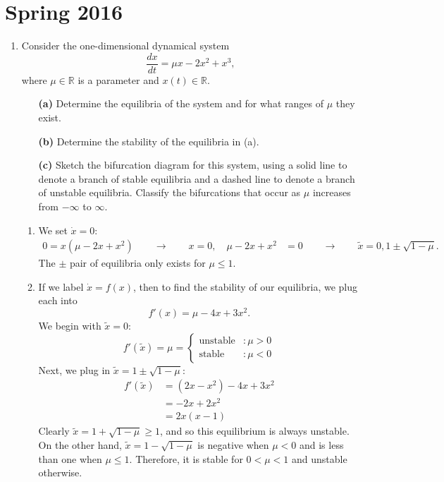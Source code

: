 \documentclass[10pt,letterpaper]{report}
\newcommand{\R}{\mathbb{R}}
\newcommand{\so}{\qquad \rightarrow \qquad}
\renewcommand{\chaptermark}[1]{%
\markboth{#1}{}}
\begin{document}
\chapter*{Spring 2016}
\chaptermark{Spring 2016}

\begin{enumerate}
\item \begin{qbox}
Consider the one-dimensional dynamical system
\[
\frac{dx}{dt} = \mu x - 2x^2 + x^3, 
\]
where $\mu \in \R$ is a parameter and $x(t) \in \R$.
\begin{itemize}
    \item[\textbf{(a)}] Determine the equilibria of the system and for what ranges of $\mu$ they exist.
    \item[\textbf{(b)}] Determine the stability of the equilibria in (a).
    \item[\textbf{(c)}] Sketch the bifurcation diagram for this system, using a solid line to denote a branch of stable equilibria and a dashed line to denote a branch of unstable equilibria. Classify the bifurcations that occur as $\mu$ increases from $-\infty$ to $\infty$.
\end{itemize}
\end{qbox}

\begin{enumerate}
    \item We set $\dot x = 0:$
    \begin{align*}
    0 = x\left(\mu - 2x + x^2\right) \so x = 0, \quad \mu -2x + x^2 &= 0 \so \widetilde x = 0, 1 \pm \sqrt{1 - \mu}.
    \end{align*}
    The $\pm$ pair of equilibria only exists for $\mu \leq 1$.
    
    \item If we label $\dot x = f(x)$, then to find the stability of our equilibria, we plug each into
    \[
    f'(x) = \mu - 4x + 3x^2.
    \]
    We begin with $\widetilde x = 0:$
    \[
    f'(\widetilde x) = \mu = \begin{cases}
    \textrm{unstable} &: \mu > 0 \\
    \textrm{stable} &: \mu < 0
    \end{cases}
    \]
    Next, we plug in $\widetilde x = 1 \pm \sqrt{1 - \mu}:$
    \begin{align*}
        f'(\widetilde x) &= (2x - x^2) - 4x + 3x^2
        \\
        &= -2x + 2x^2 \\
        &= 2x(x - 1)
    \end{align*}
    Clearly $\widetilde x = 1 + \sqrt{1 - \mu} \geq 1$, and so this equilibrium is always unstable. On the other hand, $\widetilde x = 1 - \sqrt{1 - \mu}$ is negative when $\mu < 0$ and is less than one when $\mu \leq 1$. Therefore, it is stable for $0 < \mu < 1$ and unstable otherwise.
    

\end{enumerate}
\end{enumerate}
\end{document}
